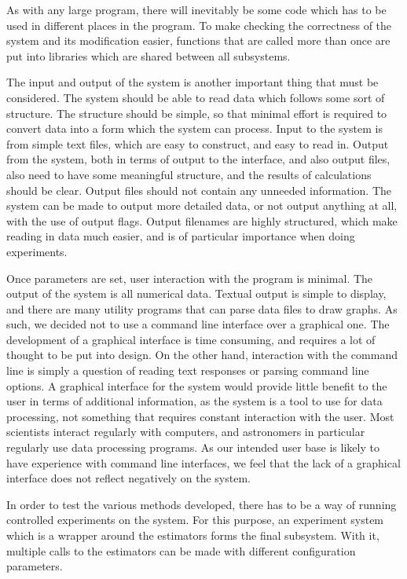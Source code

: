 \documentclass[a4paper,11pt]{article}
\begin{document}
   As with any large program, there will inevitably be some code which has to be
   used in different places in the program. To make checking the correctness of
   the system and its modification easier, functions that are called more than
   once are put into libraries which are shared between all subsystems.

   The input and output of the system is another important thing that must be
   considered. The system should be able to read data which follows some sort of
   structure. The structure should be simple, so that minimal effort is required
   to convert data into a form which the system can process. Input to the system
   is from simple text files, which are easy to construct, and easy to read
   in. Output from the system, both in terms of output to the interface, and
   also output files, also need to have some meaningful structure, and the
   results of calculations should be clear. Output files should not contain any
   unneeded information. The system can be made to output more detailed data, or
   not output anything at all, with the use of output flags. Output filenames
   are highly structured, which make reading in data much easier, and is of
   particular importance when doing experiments.

   Once parameters are set, user interaction with the program is minimal. The
   output of the system is all numerical data. Textual output is simple to
   display, and there are many utility programs that can parse data files to
   draw graphs. As such, we decided not to use a command line interface over a
   graphical one. The development of a graphical interface is time consuming,
   and requires a lot of thought to be put into design. On the other hand,
   interaction with the command line is simply a question of reading text
   responses or parsing command line options. A graphical interface for the
   system would provide little benefit to the user in terms of additional
   information, as the system is a tool to use for data processing, not
   something that requires constant interaction with the user. Most scientists
   interact regularly with computers, and astronomers in particular regularly
   use data processing programs. As our intended user base is likely to have
   experience with command line interfaces, we feel that the lack of a graphical
   interface does not reflect negatively on the system.

   In order to test the various methods developed, there has to be a way of
   running controlled experiments on the system. For this purpose, an experiment
   system which is a wrapper around the estimators forms the final
   subsystem. With it, multiple calls to the estimators can be made with
   different configuration parameters.
\end{document}
